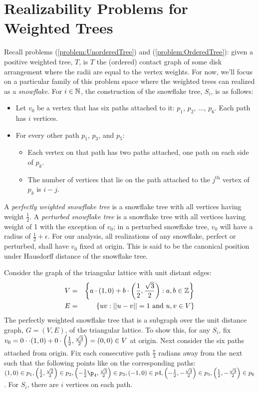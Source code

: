 \section{Realizability Problems for Weighted Trees}
Recall problems (\ref{problem:UnorderedTree}) and (\ref{problem:OrderedTree}): given a positive weighted tree, $T$, is $T$ the (ordered) contact graph of some disk arrangement where the radii are equal to the vertex weights.  For now, we'll focus on a particular family of this problem space where the weighted trees can realized as a \textit{snowflake}. For $i \in {\mathbb{N}}$, the construction of the snowflake tree, $S_i$, is as follows:
\begin{itemize}
\item Let $v_0$ be a vertex that has six paths attached to it: $p_1$, $p_2$, $\dots$, $p_6$.  Each path has $i$ vertices.
\item For every other path $p_1$, $p_3$, and $p_5$: 
	\begin{itemize}
		\item 	Each vertex on that path has two paths attached, one path on each side of $p_k$.
		\item	The number of vertices that lie on the path attached to the $j^\text{th}$ vertex of $p_k$ is $i-j$.
	\end{itemize}
\end{itemize}
A \textit{perfectly weighted snowflake tree} is a snowflake tree with all vertices having weight $\frac{1}{2}$.  A \textit{perturbed snowflake tree} is a snowflake tree with all vertices having weight of 1 with the exception of $v_0$;  in a perturbed snowflake tree, $v_0$ will have a radius of $\frac{1}{2} + \epsilon$.  For our analysis, all realizations of any snowflake, perfect or perturbed, shall have $v_0$ fixed at origin.  This is said to be the canonical position under Hausdorff distance of the snowflake tree.   

Consider the graph of the triangular lattice with unit distant edges:
\begin{eqnarray*}
V &=& \left\lbrace a\cdot (1,0) + b \cdot \left(\frac{1}{2},\frac{\sqrt{3}}{2}\right) : a,b \in {\mathbb{Z}} \right\rbrace\\
E &=& \left\lbrace uv : \vert\vert u-v \vert\vert = 1 \text{ and } u,v \in V\right\rbrace
\end{eqnarray*}
The perfectly weighted snowflake tree that is a subgraph over the unit distance graph, $G=(V,E)$, of the triangular lattice.  To show this, for any $S_i$, fix $v_0 = 0 \cdot \cdot (1,0) + 0 \cdot \left(\frac{1}{2},\frac{\sqrt{3}}{2}\right)=\left( 0,0 \right) \in V$ at origin.  Next consider the six paths attached from origin.  Fix each consecutive path $\frac{\pi}{3}$ radians away from the next such that the following points like on the corresponding paths: $\lr{1,0} \in p_1, \lr{\frac{1}{2} ,\frac{\sqrt{2}}{3}} \in p_2,\lr{-\frac{1}{2}\p_4,\frac{\sqrt{3}}{2}} \in p_3, \lr{-1,0} \in p4, \lr{-\frac{1}{2},-\frac{\sqrt{3}}{2}}\in p_5,\lr{\frac{1}{2},-\frac{\sqrt{3}}{2}}\in p_6$.  For $S_i$, there are $i$ vertices on each path.  

